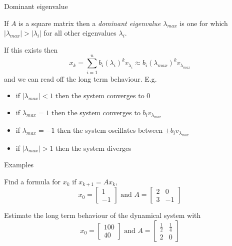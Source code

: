 \documentclass{beamer}
\begin{document}
\begin{frame}{Dominant eigenvalue}
\begin{definition}
	If $A$ is a square matrix then a \emph{dominant eigenvalue $\lambda_{max}$} is one for which $|\lambda_{max}|>|\lambda_i|$ for all other eigenvalues $\lambda_i$.
\end{definition}
If this exists then
\begin{equation*}
x_k = \sum_{i=1}^n b_i (\lambda_i)^k v_{\lambda_i} \approx b_i (\lambda_{max})^k v_{\lambda_{max}}
\end{equation*}
and we can read off the long term behaviour. E.g.
\begin{itemize}
	\item if $|\lambda_{max}|< 1$ then the system converges to $0$
	\item if $\lambda_{max} = 1$ then the system converges to $b_iv_{\lambda_{max}}$
	\item if $\lambda_{max} = -1$ then the system oscillates between $\pm b_iv_{\lambda_{max}}$
	\item if $|\lambda_{max}|>1$ then the system diverges
\end{itemize}
\end{frame}

\begin{frame}{Examples}
\begin{example}
	Find a formula for $x_k$ if $x_{k+1} = Ax_k$,
	\begin{equation*}
	x_0 = \left[
	\begin{matrix}
	1\\
	-1
	\end{matrix}
	\right] \text{ and } A = \left[
	\begin{matrix}
	2&0\\
	3&-1
	\end{matrix}
	\right]
	\end{equation*}
\end{example}
\begin{example}
	Estimate the long term behaviour of the dynamical system with
	\begin{equation*}
	x_0 = \left[
	\begin{matrix}
	100\\
	40
	\end{matrix}
	\right] \text{ and }
	A = \left[
	\begin{matrix}
	\frac{1}{2}&\frac{1}{4}\\
	2&0
	\end{matrix}
	\right]
	\end{equation*}

\end{example}
\end{frame}
\end{document}
